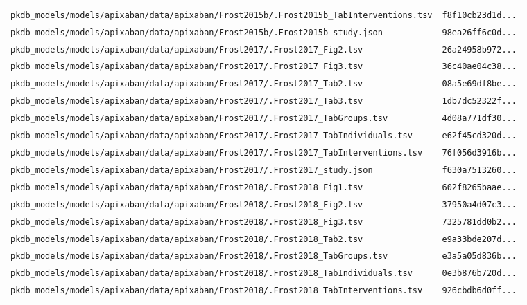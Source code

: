 \begin{longtable}{ll}
\texttt{pkdb\_models/models/apixaban/data/apixaban/Frost2015b/.Frost2015b\_TabInterventions.tsv} & \texttt{f8f10cb23d1d...} \\
\texttt{pkdb\_models/models/apixaban/data/apixaban/Frost2015b/.Frost2015b\_study.json} & \texttt{98ea26ff6c0d...} \\
\texttt{pkdb\_models/models/apixaban/data/apixaban/Frost2017/.Frost2017\_Fig2.tsv} & \texttt{26a24958b972...} \\
\texttt{pkdb\_models/models/apixaban/data/apixaban/Frost2017/.Frost2017\_Fig3.tsv} & \texttt{36c40ae04c38...} \\
\texttt{pkdb\_models/models/apixaban/data/apixaban/Frost2017/.Frost2017\_Tab2.tsv} & \texttt{08a5e69df8be...} \\
\texttt{pkdb\_models/models/apixaban/data/apixaban/Frost2017/.Frost2017\_Tab3.tsv} & \texttt{1db7dc52322f...} \\
\texttt{pkdb\_models/models/apixaban/data/apixaban/Frost2017/.Frost2017\_TabGroups.tsv} & \texttt{4d08a771df30...} \\
\texttt{pkdb\_models/models/apixaban/data/apixaban/Frost2017/.Frost2017\_TabIndividuals.tsv} & \texttt{e62f45cd320d...} \\
\texttt{pkdb\_models/models/apixaban/data/apixaban/Frost2017/.Frost2017\_TabInterventions.tsv} & \texttt{76f056d3916b...} \\
\texttt{pkdb\_models/models/apixaban/data/apixaban/Frost2017/.Frost2017\_study.json} & \texttt{f630a7513260...} \\
\texttt{pkdb\_models/models/apixaban/data/apixaban/Frost2018/.Frost2018\_Fig1.tsv} & \texttt{602f8265baae...} \\
\texttt{pkdb\_models/models/apixaban/data/apixaban/Frost2018/.Frost2018\_Fig2.tsv} & \texttt{37950a4d07c3...} \\
\texttt{pkdb\_models/models/apixaban/data/apixaban/Frost2018/.Frost2018\_Fig3.tsv} & \texttt{7325781dd0b2...} \\
\texttt{pkdb\_models/models/apixaban/data/apixaban/Frost2018/.Frost2018\_Tab2.tsv} & \texttt{e9a33bde207d...} \\
\texttt{pkdb\_models/models/apixaban/data/apixaban/Frost2018/.Frost2018\_TabGroups.tsv} & \texttt{e3a5a05d836b...} \\
\texttt{pkdb\_models/models/apixaban/data/apixaban/Frost2018/.Frost2018\_TabIndividuals.tsv} & \texttt{0e3b876b720d...} \\
\texttt{pkdb\_models/models/apixaban/data/apixaban/Frost2018/.Frost2018\_TabInterventions.tsv} & \texttt{926cbdb6d0ff...} \\

\end{longtable}
